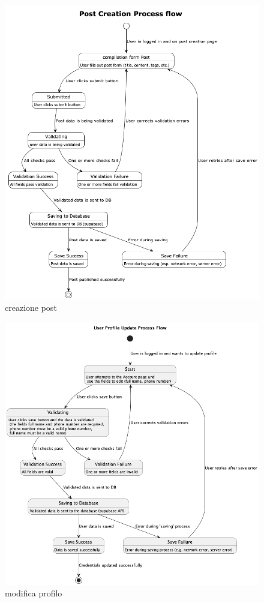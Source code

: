 \documentclass{article}
\begin{document}
    \begin{figure}[h]
        \lefting
        \includegraphics[width=1.3\textwidth]{creazione_post_flow}
        \caption{creazione post}
        \label{fig:figure3}
    \end{figure}

    \begin{figure}[h]
        \lefting
        \includegraphics[width=1.3\textwidth]{modifica_profilo_flow}
        \caption{modifica profilo}
        \label{fig:figure2}
    \end{figure}
\end{document}

